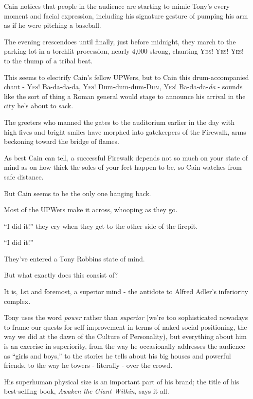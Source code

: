 \documentclass[oneside]{article}
\numberwithin{equation}{section}
\begin{document}
Cain notices that people in the audience are starting to mimic Tony's every moment and facial expression, including his signature gesture of pumping his arm as if he were pitching a baseball.

The evening crescendoes until finally, just before midnight, they march to the parking lot in a torchlit procession, nearly 4,000 strong, chanting \textsc{Yes! Yes! Yes!} to the thump of a tribal beat.

This seems to electrify Cain's fellow UPWers, but to Cain this drum-accompanied chant - \textsc{Yes!} Ba-da-da-da, \textsc{Yes!} Dum-dum-dum-\textsc{Dum, Yes!} Ba-da-da-\textit{da} - sounds like the sort of thing a Roman general would stage to announce his arrival in the city he's about to sack.

The greeters who manned the gates to the auditorium earlier in the day with high fives and bright smiles have morphed into gatekeepers of the Firewalk, arms beckoning toward the bridge of flames.

%
As best Cain can tell, a successful Firewalk depends not so much on your state of mind as on how thick the soles of your feet happen to be, so Cain watches from safe distance.

But Cain seems to be the only one hanging back.

Most of the UPWers make it across, whooping as they go.

%
``I did it!'' they cry when they get to the other side of the firepit.

``I did it!''

%
They've entered a Tony Robbins state of mind.

But what exactly does this consist of?

%
It is, 1st and foremost, a superior mind - the antidote to Alfred Adler's inferiority complex.

Tony uses the word \textit{power} rather than \textit{superior} (we're too sophisticated nowadays to frame our quests for self-improvement in terms of naked social positioning, the way we did at the dawn of the Culture of Personality), but everything about him is an exercise in superiority, from the way he occasionally addresses the audience as ``girls and boys,'' to the stories he tells about his big houses and powerful friends, to the way he towers - literally - over the crowd.

His superhuman physical size is an important part of his brand; the title of his best-selling book, \textit{Awaken the Giant Within}, says it all.
\end{document}

